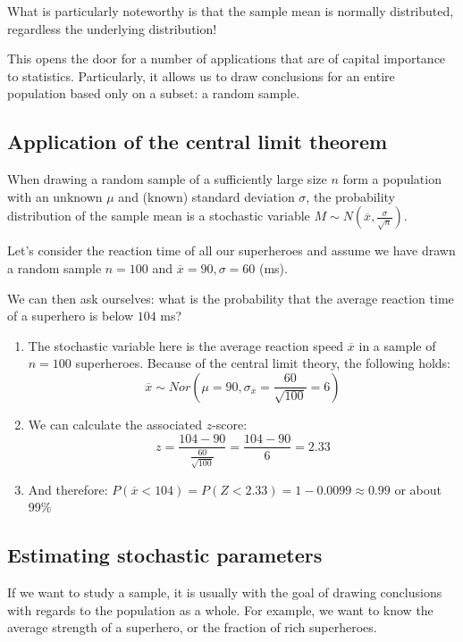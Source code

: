 What is particularly noteworthy is that the sample mean is normally distributed, regardless the underlying distribution!

This opens the door for a number of applications that are of capital importance to statistics. Particularly, it allows us to draw conclusions for an entire population based only on a subset: a random sample.

\subsection{Application of the central limit theorem}

When drawing a random sample of a sufficiently large size $n$ form a population with an unknown $\mu$ and (known) standard deviation $\sigma$, the probability distribution of the sample mean is a stochastic variable $M \sim N (\overline{x}, \frac{\sigma}{\sqrt{n}})$.

\begin{example}
  Let's consider the reaction time of all our superheroes and assume we have drawn a random sample $n = 100$ and $\overline{x} = 90, \sigma = 60$ (ms).
  
  We can then ask ourselves: what is the probability that the average reaction time of a superhero is below $104$ ms?

  \begin{enumerate}
    \item The stochastic variable here is the average reaction speed $\overline{x}$ in a sample of $n=100$ superheroes. Because of the central limit theory, the following holds:
    \[ \overline{x} \sim Nor(\mu = 90, \sigma_{\overline{x}} = \frac{60}{\sqrt{100}} = 6) \]
    \item We can calculate the associated $z$-score:
    \[ z = \frac{104-90}{\frac{60}{\sqrt{100}}} = \frac{104-90}{6} = 2.33 \]
    \item And therefore: $P(\overline{x} < 104) = P(Z < 2.33) = 1 - 0.0099 \approx 0.99$ or about 99\%
  \end{enumerate}
\end{example}

\subsection{Estimating stochastic parameters}
\label{ssec:estimating-stochastic-parameters}

If we want to study a sample, it is usually with the goal of drawing conclusions with regards to the population as a whole. For example, we want to know the average strength of a superhero, or the fraction of rich superheroes. 

